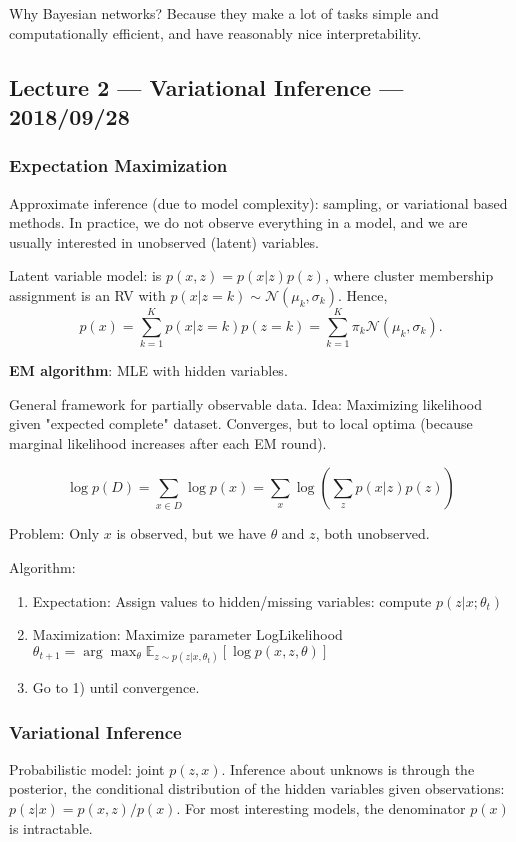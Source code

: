 \documentclass{article}
\newcommand{\E}[2]{\mathbb{E}_{#1}\left[#2\right]}
\newcommand{\mc}[1]{\mathcal{#1}}
\begin{document}
Why Bayesian networks? Because they make a lot of tasks simple and computationally efficient, and have reasonably nice interpretability.

\subsection{Lecture 2 --- Variational Inference --- 2018/09/28}

\subsubsection{Expectation Maximization}

Approximate inference (due to model complexity): sampling, or variational based methods. In practice, we do not observe everything in a model, and we are usually interested in unobserved (latent) variables.

Latent variable model: is $p(x, z) = p(x|z)p(z)$, where cluster membership assignment is an RV with $p(x|z=k) \sim \mc{N}(\mu_k, \sigma_k)$. Hence,
$$p(x) = \sum_{k=1}^K p(x|z=k)p(z=k) = \sum_{k=1}^K \pi_k \mc{N}(\mu_k, \sigma_k).$$

\textbf{EM algorithm}: MLE with hidden variables.

General framework for partially observable data. Idea: Maximizing likelihood given "expected complete" dataset. Converges, but to local optima (because marginal likelihood increases after each EM round).

$$\log p(D) = \sum_{x \in D} \log p(x) = \sum_x \log (\sum_z p(x|z)p(z))$$

Problem: Only $x$ is observed, but we have $\theta$ and $z$, both unobserved.

Algorithm:
\begin{enumerate}
    \item Expectation: Assign values to hidden/missing variables: compute $p(z|x; \theta_t)$
    \item Maximization: Maximize parameter LogLikelihood $\theta_{t+1} = \arg \max_\theta \E{z \sim p(z|x, \theta_t)}{\log p(x, z, \theta)}$
    \item Go to 1) until convergence.
\end{enumerate}

\subsubsection{Variational Inference}

Probabilistic model: joint $p(z, x)$. Inference about unknows is through the posterior, the conditional distribution of the hidden variables given observations: $p(z|x) = p(x, z) / p(x)$. For most interesting models, the denominator $p(x)$ is intractable.
\end{document}
